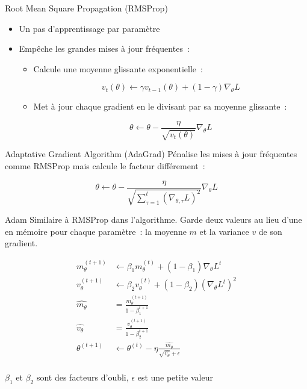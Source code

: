 \begin{frame}{Root Mean Square Propagation (RMSProp)}
  \begin{itemize}[<+->]
    \item Un pas d'apprentissage par paramètre
    \item Empêche les grandes mises à jour fréquentes~:
      \begin{itemize}
        \item Calcule une moyenne glissante exponentielle~:

        \[v_t(\theta) \leftarrow \gamma v_{t-1}(\theta) + (1 - \gamma)\nabla_\theta L\]

        \item Met à jour chaque gradient en le divisant par sa moyenne glissante~:

        \[\theta \leftarrow \theta - \frac{\eta}{\sqrt{v_t(\theta)}}\nabla_\theta L\]
      \end{itemize}
  \end{itemize}
\end{frame}

\begin{frame}{Adaptative Gradient Algorithm (AdaGrad)}
  Pénalise les mises à jour fréquentes comme RMSProp mais calcule le facteur différement~:

  \[
    \theta \leftarrow \theta - \frac{\eta}{\sqrt{\sum_{\tau=1}^t(\nabla_{\theta,\tau} L)^2}}\nabla_{\theta} L
  \]
\end{frame}

\begin{frame}{Adam}
  Similaire à RMSProp dans l'algorithme. Garde deux valeurs au lieu d'une en mémoire pour chaque paramètre~: la moyenne $m$ et la variance $v$ de son gradient.

  \begin{align*}
    m_\theta^{(t+1)} &\leftarrow \beta_1m_\theta^{(t)} + (1 - \beta_1)\nabla_\theta L^{t} \\
    v_\theta^{(t+1)} &\leftarrow \beta_2v_\theta^{(t)} + (1 - \beta_2)(\nabla_\theta L^{t})^2 \\
    \hat{m_\theta} &= \frac{m_\theta^{(t+1)}}{1 - \beta_1^{t+1}} \\
    \hat{v_\theta} &= \frac{v_\theta^{(t+1)}}{1 - \beta_2^{t+1}} \\
    \theta^{(t+1)} &\leftarrow \theta^{(t)} - \eta\frac{\hat{m_\theta}}{\sqrt{\hat{v_\theta}} + \epsilon} \\
  \end{align*}

  $\beta_1$ et $\beta_2$ sont des facteurs d'oubli, $\epsilon$ est une petite valeur
\end{frame}
